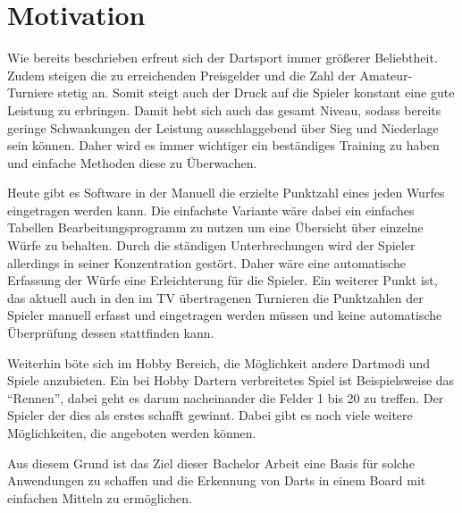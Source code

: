 \section*{Motivation}
\label{sec:motivation}
Wie bereits beschrieben erfreut sich der Dartsport immer größerer Beliebtheit. Zudem steigen die zu erreichenden Preisgelder und die Zahl der Amateur-Turniere stetig an. Somit steigt auch der Druck auf die Spieler konstant eine gute Leistung zu erbringen. Damit hebt sich auch das gesamt Niveau, sodass bereits geringe Schwankungen der Leistung ausschlaggebend über Sieg und Niederlage sein können. Daher wird es immer wichtiger ein beständiges Training zu haben und einfache Methoden diese zu Überwachen. 

Heute gibt es Software in der Manuell die erzielte Punktzahl eines jeden Wurfes eingetragen werden kann. Die einfachste Variante wäre dabei ein einfaches Tabellen Bearbeitungsprogramm zu nutzen um eine Übersicht über einzelne Würfe zu behalten. 
Durch die ständigen Unterbrechungen wird der Spieler allerdings in seiner Konzentration gestört. 
Daher wäre eine automatische Erfassung der Würfe eine Erleichterung für die Spieler. Ein weiterer Punkt ist, das aktuell auch in den im TV übertragenen Turnieren die Punktzahlen der Spieler manuell erfasst und eingetragen werden müssen und keine automatische Überprüfung dessen stattfinden kann. 

Weiterhin böte sich im Hobby Bereich, die Möglichkeit andere Dartmodi und Spiele anzubieten. Ein bei Hobby Dartern verbreitetes Spiel ist Beispielsweise das "`Rennen"', dabei geht es darum nacheinander die Felder 1 bis 20 zu treffen. Der Spieler der dies als erstes schafft gewinnt. Dabei gibt es noch viele weitere Möglichkeiten, die angeboten werden können.

Aus diesem Grund ist das Ziel dieser Bachelor Arbeit eine Basis für solche Anwendungen zu schaffen und die Erkennung von Darts in einem Board mit einfachen Mitteln zu ermöglichen.